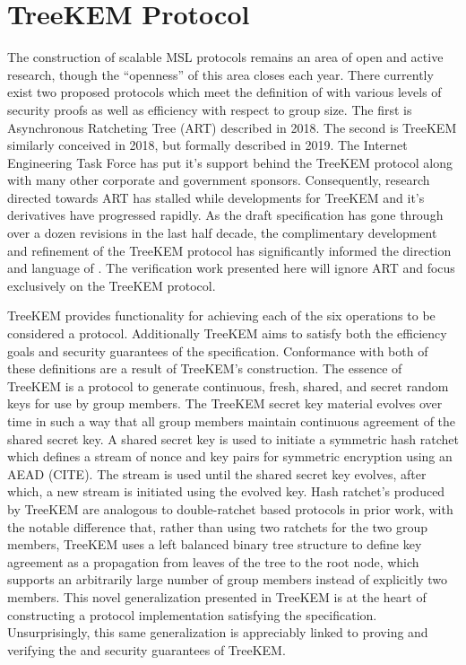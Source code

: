 \hypertarget{treekem-protocol}{%
\section{TreeKEM Protocol}\label{treekem-protocol}}

The construction of scalable MSL protocols remains an area of open and active research, though the ``openness'' of this area closes each year.
There currently exist two proposed protocols which meet the definition of  with various levels of security proofs as well as efficiency with respect to group size.
The first is Asynchronous Ratcheting Tree (ART) \autocite{cohn2018ends} described in 2018.
The second is TreeKEM \autocite{bhargavan:hal-02425247} similarly conceived in 2018, but formally described in 2019.
The Internet Engineering Task Force has put it's support behind the TreeKEM protocol along with many other corporate and government sponsors.
Consequently, research directed towards ART has stalled while developments for TreeKEM and it's derivatives have progressed rapidly.
As the  draft specification has gone through over a dozen revisions in the last half decade, the complimentary development and refinement of the TreeKEM protocol has significantly informed the direction and language of .
The verification work presented here will ignore ART and focus exclusively on the TreeKEM protocol.

TreeKEM provides functionality for achieving each of the six operations to be considered a  protocol.
Additionally TreeKEM aims to satisfy both the efficiency goals and security guarantees of the  specification.
Conformance with both of these definitions are a result of TreeKEM's construction.
The essence of TreeKEM is a protocol to generate continuous, fresh, shared, and secret random keys for use by group members.
The TreeKEM secret key material evolves over time in such a way that all group members maintain continuous agreement of the shared secret key.
A shared secret key is used to initiate a symmetric hash ratchet which defines a stream of nonce and key pairs for symmetric encryption using an AEAD (CITE).
The stream is used until the shared secret key evolves, after which, a new stream is initiated using the evolved key.
Hash ratchet's produced by TreeKEM are analogous to double-ratchet based protocols in prior work, with the notable difference that, rather than using two ratchets for the two group members, TreeKEM uses a left balanced binary tree structure to define key agreement as a propagation from leaves of the tree to the root node, which supports an arbitrarily large number of group members instead of explicitly two members.
This novel generalization presented in TreeKEM is at the heart of constructing a protocol implementation satisfying the  specification.
Unsurprisingly, this same generalization is appreciably linked to proving and verifying the  and  security guarantees of TreeKEM.

